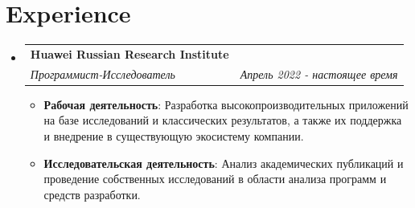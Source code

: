 \documentclass[a4paper,22pt]{article}
\makeatletter
\newcommand{\resumeItem}[2]{
  \item\small{
    \textbf{#1}{: #2 \vspace{-2pt}}
  }
}
\newcommand{\resumeSubheading}[4]{
  \vspace{-1pt}\item
    \begin{tabular*}{0.97\textwidth}{l@{\extracolsep{\fill}}r}
      \textbf{#1} & #2 \\
      \textit{#3} & \textit{#4} \\
    \end{tabular*}\vspace{-5pt}
}
\newcommand{\resumeSubHeadingListStart}{\begin{itemize}[leftmargin=*]}
\newcommand{\resumeSubHeadingListEnd}{\end{itemize}}
\newcommand{\resumeItemListStart}{\begin{itemize}}
\newcommand{\resumeItemListEnd}{\end{itemize}\vspace{-5pt}}
\makeatother
\begin{document}
\section{Experience}
  \resumeSubHeadingListStart
    \resumeSubheading{Huawei Russian Research Institute}{}
    {Программист-Исследователь}{Апрель 2022 - настоящее время}
        \resumeItemListStart
        \resumeItem{Рабочая деятельность}{Разработка высокопроизводительных приложений на базе исследований и классических результатов, а также их поддержка и внедрение в существующую экосистему компании.}
        \resumeItem{Исследовательская деятельность}{Анализ академических публикаций и проведение собственных исследований в области анализа программ и средств разработки.}
      \resumeItemListEnd
\resumeSubHeadingListEnd

\vspace{-5pt}
\end{document}
